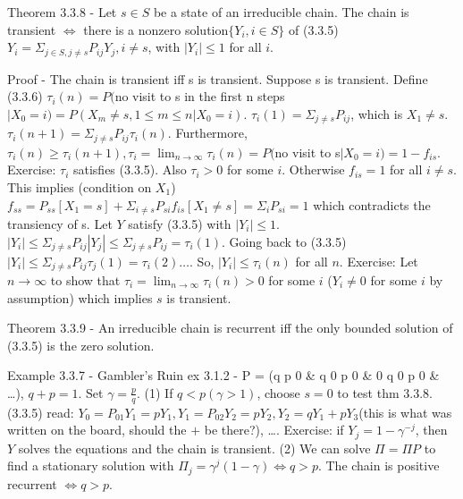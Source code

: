 \documentclass{article}
\begin{document}
Theorem 3.3.8 - Let $s \in S$ be a state of an irreducible chain. The chain is transient $\iff$ there is a nonzero solution$\{Y_i, i \in S\}$ of (3.3.5) $Y_i = \Sigma_{j \in S, j \ne s} P_{ij} Y_j, i \ne s$, with $|Y_i| \le 1$ for all $i$.

Proof - The chain is transient iff s is transient. Suppose s is transient. Define (3.3.6) $\tau_i(n) = P($no visit to s in the first n steps$|X_0=i) = P(X_m \ne s, 1 \le m \le n | X_0=i)$. $\tau_i(1) = \Sigma_{j \ne s} P_{ij}$, which is $X_1 \ne s$. $\tau_i(n+1) = \Sigma_{j \ne s} P_{ij} \tau_i(n)$. Furthermore, $\tau_i(n) \ge \tau_i(n+1), \tau_i = \lim_{n \rightarrow \infty} \tau_i(n) = P($no visit to s$|X_0=i) = 1 - f_{is}$. Exercise: $\tau_i$ satisfies (3.3.5). Also $\tau_i > 0$ for some $i$. Otherwise $f_{is} = 1$ for all $i \ne s$. This implies (condition on $X_1$) $f_{ss} = P_{ss} [X_1 = s] + \Sigma_{i \ne s} P_{si} f_{is} [X_1 \ne s] = \Sigma_i P_{si} = 1$ which contradicts the transiency of s. Let $Y$ satisfy (3.3.5) with $|Y_i| \le 1$. $|Y_i| \le \Sigma_{j \ne s} P_{ij} |Y_j| \le \Sigma_{j \ne s} P_{ij} = \tau_i(1)$. Going back to (3.3.5) $|Y_i| \le \Sigma_{j \ne s} P_{ij} \tau_j(1) = \tau_i(2) \dots$. So, $|Y_i| \le \tau_i(n)$ for all $n$. Exercise: Let $n \rightarrow \infty$ to show that $\tau_i = \lim_{n \rightarrow \infty} \tau_i(n) > 0$ for some $i$ ($Y_i \ne 0$ for some $i$ by assumption) which implies $s$ is transient.

Theorem 3.3.9 - An irreducible chain is recurrent iff the only bounded solution of (3.3.5) is the zero solution.

Example 3.3.7 - Gambler's Ruin ex 3.1.2 - P = (q p 0 \& q 0 p 0 \& 0 q 0 p 0 \& \dots), $q + p = 1$. Set $\gamma = \frac{p}{q}$. (1) If $q < p (\gamma > 1)$, choose $s = 0$ to test thm 3.3.8. (3.3.5) read: $Y_0 = P_{01} Y_1 = p Y_1, Y_1 = P_{02} Y_2 = p Y_2, Y_2 = q Y_1 + p Y_3 $(this is what was written on the board, should the $+$ be there?), \dots. Exercise: if $Y_j = 1 - \gamma^{-j}$, then $Y$ solves the equations and the chain is transient. (2) We can solve $\Pi = \Pi P$ to find a stationary solution with $\Pi_j = \gamma^j (1 - \gamma) \iff q > p$. The chain is positive recurrent $\iff q > p$.
\end{document}
